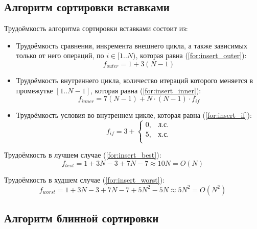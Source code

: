 \subsection{Алгоритм сортировки вставками}

Трудоёмкость алгоритма сортировки вставками состоит из:
\begin{itemize}
    \item Трудоёмкость сравнения, инкремента внешнего цикла, а также зависимых только от него операций, по $i \in [1..N)$, которая равна (\ref{for:insert_outer}):
        \begin{equation}
            \label{for:insert_outer}
            f_{outer} = 1 + 3(N - 1)
        \end{equation}
    \item Трудоёмкость внутреннего цикла, количество итераций которого меняется в промежутке $[1..N-1]$, которая равна (\ref{for:insert_inner}):
        \begin{equation}
            \label{for:insert_inner}
            f_{inner} = 7(N - 1) + N \cdot (N - 1) \cdot f_{if}
        \end{equation}
    \item Трудоёмкость условия во внутреннем цикле, которая равна (\ref{for:insert_if}):
        \begin{equation}
            \label{for:insert_if}
            f_{if} = 3 + \begin{cases}
                0, & \text{л.с.}\\
                5, & \text{х.с.}\\
            \end{cases}
        \end{equation}
\end{itemize}

Трудоёмкость в лучшем случае (\ref{for:insert_best}):
\begin{equation}
    \label{for:insert_best}
    f_{best} = 1 + 3N - 3 + 7N - 7 \approx 10N = O(N)
\end{equation}

Трудоёмкость в худшем случае (\ref{for:insert_worst}):
\begin{equation}
    \label{for:insert_worst}
    f_{worst} = 1 + 3N - 3 + 7N - 7 + 5N^2 - 5N \approx 5N^2 = O(N^2)
\end{equation}


\subsection{Алгоритм блинной сортировки}

